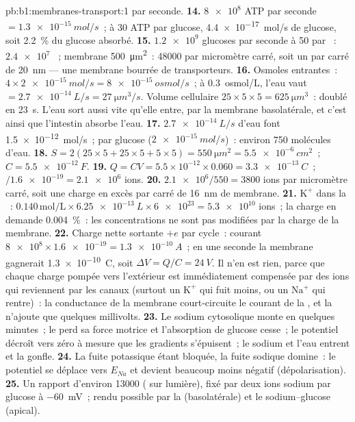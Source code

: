 \begin{solution}{pb:b1:membranes-transport:1}
par seconde.
\textbf{14.} $\num{8e8}$ ATP par seconde $= \qty{1.3e-15}{mol/s}$~; à
30 ATP par glucose, \qty{4.4e-17}{mol/s} de glucose, soit \qty{2.2}{\%}
du glucose absorbé.
\textbf{15.} $\num{1.2e9}$ glucoses par seconde à 50 par ~:
$\num{2.4e7}$ ~; membrane \qty{500}{\micro m^2}~: \num{48000}
par micromètre carré, soit un par carré de \qty{20}{nm} --- une
membrane bourrée de transporteurs.
\textbf{16.} Osmoles entrantes~: $4\times\qty{2e-15}{mol/s} =
\qty{8e-15}{osmol/s}$~; à \qty{0.3}{osmol/L}, l'eau vaut
$= \qty{2.7e-14}{L/s} = \qty{27}{\micro m^3/s}$. Volume cellulaire
$25\times 5\times 5 = \qty{625}{\micro m^3}$~: doublé en \qty{23}{s}.
L'eau sort aussi vite qu'elle entre, par la membrane basolatérale, et
c'est ainsi que l'intestin absorbe l'eau.
\textbf{17.} $\qty{2.7e-14}{L/s}$ d'eau font \qty{1.5e-12}{mol/s}~; par glucose ($\qty{2e-15}{mol/s}$)~: environ 750 molécules d'eau.
\textbf{18.} $S = 2(25\times 5 + 25\times 5 + 5\times 5) =
\qty{550}{\micro m^2} = \qty{5.5e-6}{cm^2}$~; $C = \qty{5.5e-12}{F}$.
\textbf{19.} $Q = CV = 5.5\times 10^{-12}\times 0.060 =
\qty{3.3e-13}{C}$~; $/\num{1.6e-19} = \num{2.1e6}$ ions.
\textbf{20.} $\num{2.1e6}/550 = 3800$ ions par micromètre carré, soit une charge en excès par carré de \qty{16}{nm} de membrane.
\textbf{21.} $\mathrm{K^+}$ dans la ~: $0.140\,\mathrm{mol/L}\times
\qty{6.25e-13}{L}\times\num{6e23} = \num{5.3e10}$ ions~; la charge en
demande \qty{0.004}{\%}~: les concentrations ne sont pas modifiées par
la charge de la membrane.
\textbf{22.} Charge nette sortante $+e$ par cycle~: courant $\num{8e8}\times
\num{1.6e-19} = \qty{1.3e-10}{A}$~; en une seconde la membrane gagnerait
\qty{1.3e-10}{C}, soit $\Delta V = Q/C = \qty{24}{V}$. Il n'en est rien,
parce que chaque charge pompée vers l'extérieur est immédiatement
compensée par des ions qui reviennent par les canaux (surtout un
$\mathrm{K^+}$ qui fuit moins, ou un $\mathrm{Na^+}$ qui rentre)~: la
conductance de la membrane court-circuite le courant de la , et la
 n'ajoute que quelques millivolts.
\textbf{23.} Le sodium cytosolique monte en quelques minutes~; le
 perd sa force motrice et l'absorption de glucose cesse~; le
potentiel décroît vers zéro à mesure que les gradients s'épuisent~; le
sodium et l'eau entrent et la  gonfle.
\textbf{24.} La fuite potassique étant bloquée, la fuite sodique
domine~: le potentiel se déplace vers $E_{Na}$ et devient beaucoup moins
négatif (dépolarisation).
\textbf{25.} Un rapport d'environ \num{13000} ( sur lumière),
fixé par deux ions sodium par glucose à \qty{-60}{mV}~; rendu possible
par la  (basolatérale) et le 
sodium--glucose (apical).
\end{solution}
